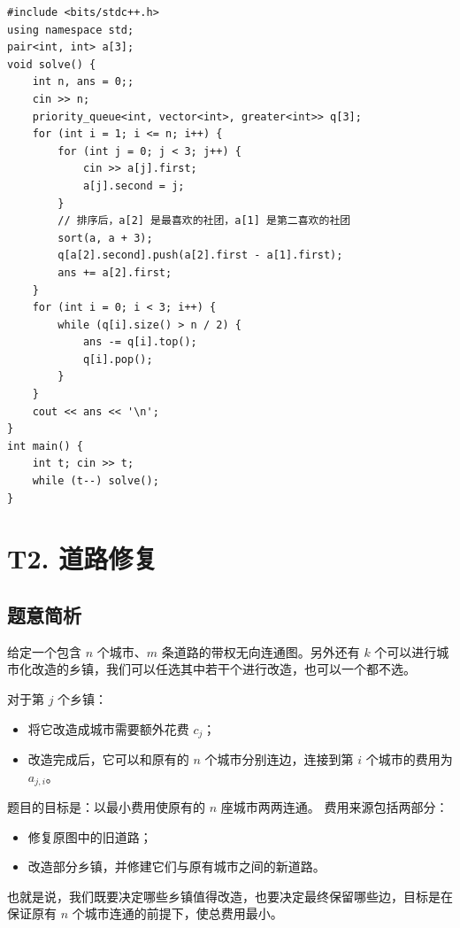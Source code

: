 \documentclass{book}
\begin{document}
\begin{lstlisting}[style = code]
#include <bits/stdc++.h>
using namespace std;
pair<int, int> a[3];
void solve() {
    int n, ans = 0;;
    cin >> n;
    priority_queue<int, vector<int>, greater<int>> q[3];
    for (int i = 1; i <= n; i++) {
        for (int j = 0; j < 3; j++) {
            cin >> a[j].first;
            a[j].second = j;
        }
        // 排序后，a[2] 是最喜欢的社团，a[1] 是第二喜欢的社团
        sort(a, a + 3);
        q[a[2].second].push(a[2].first - a[1].first);
        ans += a[2].first;
    }
    for (int i = 0; i < 3; i++) {
        while (q[i].size() > n / 2) {
            ans -= q[i].top();
            q[i].pop();
        }
    }
    cout << ans << '\n';
}
int main() {
    int t; cin >> t;
    while (t--) solve();
}\end{lstlisting}

\newpage
\section{T2. 道路修复}

\subsection{题意简析}

给定一个包含 $n$ 个城市、$m$ 条道路的带权无向连通图。另外还有 $k$ 个可以进行城市化改造的乡镇，我们可以任选其中若干个进行改造，也可以一个都不选。

对于第 $j$ 个乡镇：

\begin{itemize}[itemsep=2pt, topsep=2pt, parsep=0pt, partopsep=0pt]
    \item 将它改造成城市需要额外花费 $c_j$；
    \item 改造完成后，它可以和原有的 $n$ 个城市分别连边，连接到第 $i$ 个城市的费用为 $a_{j,i}$。
\end{itemize}

题目的目标是：以最小费用使原有的 $n$ 座城市两两连通。  
费用来源包括两部分：

\begin{itemize}[itemsep=2pt, topsep=2pt, parsep=0pt, partopsep=0pt]
    \item 修复原图中的旧道路；
    \item 改造部分乡镇，并修建它们与原有城市之间的新道路。
\end{itemize}

也就是说，我们既要决定哪些乡镇值得改造，也要决定最终保留哪些边，目标是在保证原有 $n$ 个城市连通的前提下，使总费用最小。
\end{document}
